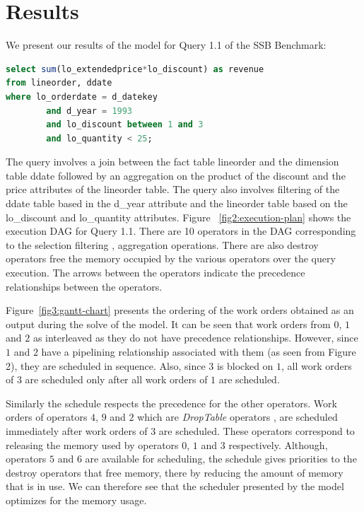 \documentclass[20pt]{sigchi}
\begin{document}
\section{Results}
We present our results of the model for Query 1.1 of the SSB Benchmark: 
\begin{lstlisting}[language=sql,basicstyle=\ttfamily,breaklines=true,morekeywords={*,select},]
select sum(lo_extendedprice*lo_discount) as revenue
from lineorder, ddate
where lo_orderdate = d_datekey
		and d_year = 1993
		and lo_discount between 1 and 3
		and lo_quantity < 25;
\end{lstlisting}
The query involves a  join between the fact table lineorder and the dimension table ddate followed by an aggregation on the product of the discount and the price attributes of the lineorder table. The query also  involves filtering of  the ddate table  based in the d\_year attribute and the lineorder table based  on the lo\_discount and lo\_quantity attributes.
Figure ~\ref{fig2:execution-plan} shows the execution DAG for  Query 1.1.  There are 10 operators in the DAG corresponding to the selection filtering , aggregation operations. There are also destroy operators free the memory occupied by the various operators over the query execution. The arrows between the operators indicate the precedence relationships between the operators.

Figure~\ref{fig3:gantt-chart} presents the ordering of the work orders  obtained as an output during the solve of the model. 
It can be seen that work orders from $0$, $1$  and $2$ as interleaved as they do not have precedence relationships.
However, since $1$  and $2$  have a pipelining relationship associated with them (as seen from  Figure 2), they are scheduled in sequence. Also, since $3$ is blocked on $1$, all work orders of $3$ are scheduled only after all work orders of $1$ are scheduled.

Similarly the schedule respects the precedence for the other operators.  Work orders of  operators $4$, $9$  and $2$ which are \textit{DropTable} operators , are scheduled immediately after work orders of $3$ are scheduled.  These operators correspond to releasing the memory used by operators $0$, $1$  and $3$ respectively. Although, operators $5$ and $6$  are available for scheduling, the schedule gives priorities to the destroy operators that free memory, there by reducing the amount of memory that is in use. We can therefore see that the scheduler presented by the model optimizes for the memory usage.
\end{document}
